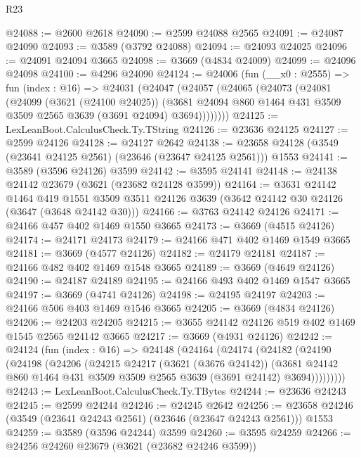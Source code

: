 \begin{lexlean}{R23}
\begin{coremodule}
@24088 := @2600 @2618
@24090 := @2599 @24088 @2565
@24091 := @24087 @24090
@24093 := @3589 (@3792 @24088)
@24094 := @24093 @24025
@24096 := @24091 @24094 @3665
@24098 := @3669 (@4834 @24009)
@24099 := @24096 @24098
@24100 := @4296 @24090
@24124 := @24006
    (fun (__x0 : @2555) =>
    fun (index : @16) =>
    @24031
      (@24047
        (@24057
          (@24065
            (@24073
              (@24081
                (@24099
                  (@3621 (@24100 @24025))
                  (@3681 @24094 @860 @1464 @431 @3509 @3509 @2565 @3639 (@3691 @24094) @3694))))))))
@24125 := LexLeanBoot.CalculusCheck.Ty.TString
@24126 := @23636 @24125
@24127 := @2599 @24126
@24128 := @24127 @2642
@24138 := @23658 @24128 (@3549 (@23641 @24125 @2561) (@23646 (@23647 @24125 @2561))) @1553
@24141 := @3589 (@3596 @24126) @3599
@24142 := @3595 @24141
@24148 := @24138 @24142 @23679 (@3621 (@23682 @24128 @3599))
@24164 := @3631
    @24142
    @1464
    @419
    @1551
    @3509
    @3511
    @24126
    @3639
    (@3642 @24142 @30 @24126 (@3647 (@3648 @24142 @30)))
@24166 := @3763 @24142 @24126
@24171 := @24166 @457 @402 @1469 @1550 @3665
@24173 := @3669 (@4515 @24126)
@24174 := @24171 @24173
@24179 := @24166 @471 @402 @1469 @1549 @3665
@24181 := @3669 (@4577 @24126)
@24182 := @24179 @24181
@24187 := @24166 @482 @402 @1469 @1548 @3665
@24189 := @3669 (@4649 @24126)
@24190 := @24187 @24189
@24195 := @24166 @493 @402 @1469 @1547 @3665
@24197 := @3669 (@4741 @24126)
@24198 := @24195 @24197
@24203 := @24166 @506 @403 @1469 @1546 @3665
@24205 := @3669 (@4834 @24126)
@24206 := @24203 @24205
@24215 := @3655 @24142 @24126 @519 @402 @1469 @1545 @2565 @24142 @3665
@24217 := @3669 (@4931 @24126)
@24242 := @24124
    (fun (index : @16) =>
    @24148
      (@24164
        (@24174
          (@24182
            (@24190
              (@24198
                (@24206
                  (@24215
                    @24217
                    (@3621 (@3676 @24142))
                    (@3681
                      @24142
                      @860
                      @1464
                      @431
                      @3509
                      @3509
                      @2565
                      @3639
                      (@3691 @24142)
                      @3694)))))))))
@24243 := LexLeanBoot.CalculusCheck.Ty.TBytes
@24244 := @23636 @24243
@24245 := @2599 @24244
@24246 := @24245 @2642
@24256 := @23658 @24246 (@3549 (@23641 @24243 @2561) (@23646 (@23647 @24243 @2561))) @1553
@24259 := @3589 (@3596 @24244) @3599
@24260 := @3595 @24259
@24266 := @24256 @24260 @23679 (@3621 (@23682 @24246 @3599))

\end{coremodule}
\end{lexlean}
